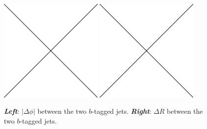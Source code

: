 \begin{figure}[!htb]
    \begin{center}
        \includegraphics[width=0.45\textwidth]{figures/placeholder}
        \includegraphics[width=0.45\textwidth]{figures/placeholder}
        \caption{
            \textit{\textbf{Left}}: $|\Delta \phi|$ between the two $b$-tagged jets.
            \textit{\textbf{Right}}: $\Delta R$ between the two $b$-tagged jets.
        }
        \label{fig:hh_kin_0}
    \end{center}
\end{figure}

